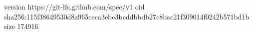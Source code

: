 version https://git-lfs.github.com/spec/v1
oid sha256:115f38649530d8a965ceca3ebc3bcddbbdb27c8bac21f309014f0242b571bd1b
size 174916
